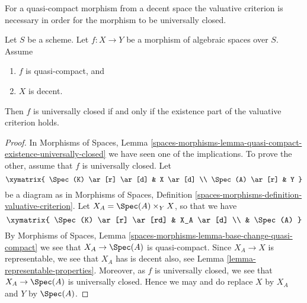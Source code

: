 \noindent
For a quasi-compact morphism from a decent space the valuative
criterion is necessary in order for the morphism to be
universally closed.


\begin{proposition}
\label{proposition-characterize-universally-closed}
Let $S$ be a scheme.
Let $f : X \to Y$ be a morphism of algebraic spaces over $S$.
Assume
\begin{enumerate}
\item $f$ is quasi-compact, and
\item $X$ is decent.
\end{enumerate}
Then $f$ is universally closed if and only if the
existence part of the valuative criterion holds.
\end{proposition}

\begin{proof}
In
Morphisms of Spaces,
Lemma \ref{spaces-morphisms-lemma-quasi-compact-existence-universally-closed}
we have seen one of the implications.
To prove the other, assume that $f$ is universally closed. Let
$$
\xymatrix{
\Spec(K) \ar[r] \ar[d] & X \ar[d] \\
\Spec(A) \ar[r] & Y
}
$$
be a diagram as in
Morphisms of Spaces,
Definition \ref{spaces-morphisms-definition-valuative-criterion}.
Let $X_A = \Spec(A) \times_Y X$, so that we have
$$
\xymatrix{
\Spec(K) \ar[r] \ar[rd] & X_A \ar[d] \\
 & \Spec(A)
}
$$
By
Morphisms of Spaces,
Lemma \ref{spaces-morphisms-lemma-base-change-quasi-compact}
we see that $X_A \to \Spec(A)$ is quasi-compact. Since $X_A \to X$
is representable, we see that $X_A$ has is decent also, see
Lemma \ref{lemma-representable-properties}.
Moreover, as $f$ is universally closed, we see that $X_A \to \Spec(A)$
is universally closed.
Hence we may and do replace $X$ by $X_A$ and $Y$ by $\Spec(A)$.


\end{proof}
